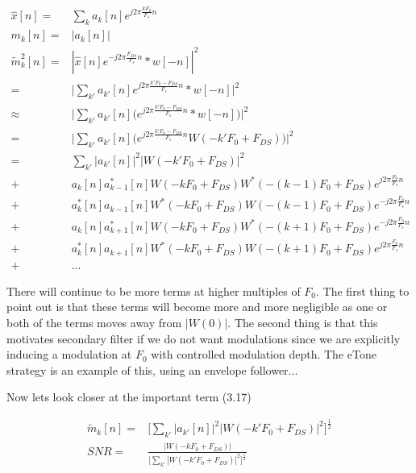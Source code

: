 \documentclass [11pt, proquest] {uwthesis}[2015/03/03]
\begin{document}
\begin{align}
\widehat{x}[n] =& \sum_k a_k[n] e^{j2\pi \frac{kF_0}{F_s} n} \\
m_k[n] =& | a_k[n]| \\
\tilde{m}_k^2[n] =&  | \widehat{x}[n] e^{-j2\pi \frac{F_{DS}}{F_s} n} * w[-n] |^2 \nonumber \\
=& \Big| \sum_{k'} a_{k'}[n] e^{j2\pi \frac{k'F_0 - F_{DS}}{F_s} n}* w[-n] \Big|^2 \nonumber \\
\approx& \Big| \sum_{k'} a_{k'}[n] \Big( e^{j2\pi \frac{k'F_0 - F_{DS}}{F_s} n}* w[-n] \Big) \Big|^2 \nonumber \\
=& \Big| \sum_{k'} a_{k'}[n] \Big( e^{j2\pi \frac{k'F_0 - F_{DS}}{F_s} n} W(-k'F_0 + F_{DS}) \Big) \Big|^2 \nonumber \\
=& \sum_{k'} | a_{k'}[n]|^2 |W(-k'F_0 + F_{DS})|^2 \\
+& a_k[n]a_{k-1}^*[n]W(-kF_0 + F_{DS})W^*(-(k-1)F_0 + F_{DS}) e^{j2\pi \frac{F_0}{F_s} n} \nonumber \\
+& a_k^*[n]a_{k-1}[n]W^*(-kF_0 + F_{DS})W(-(k-1)F_0 + F_{DS}) e^{-j2\pi \frac{F_0}{F_s} n}\nonumber \\
+& a_k[n]a_{k+1}^*[n]W(-kF_0 + F_{DS})W^*(-(k+1)F_0 + F_{DS})e^{-j2\pi \frac{F_0}{F_s} n} \nonumber \\
+& a_k^*[n]a_{k+1}[n]W^*(-kF_0 + F_{DS})W(-(k+1)F_0 + F_{DS})e^{j2\pi \frac{F_0}{F_s} n} \nonumber \\
+& ...
\end{align}

There will continue to be more terms at higher multiples of $F_0$.  The first thing to point out is that these terms will become more and more negligible as one or both of the terms moves away from $|W(0)|$.  The second thing is that this motivates secondary filter if we do not want modulations since we are explicitly inducing a modulation at $F_0$ with controlled modulation depth.  The eTone strategy is an example of this, using an envelope follower...

Now lets look closer at the important term (3.17)

\begin{align}
\tilde{m}_k[n] =& \Bigg[ \sum_{k'} | a_{k'}[n]|^2 |W(-k'F_0 + F_{DS})|^2 \Bigg]^\frac{1}{2} \\
SNR =& \frac{|W(-kF_0 + F_{DS})|}{\Big[ \sum_{k'} |W(-k'F_0 + F_{DS})|^2 \Big]^\frac{1}{2}}
\end{align}
\end{document}
